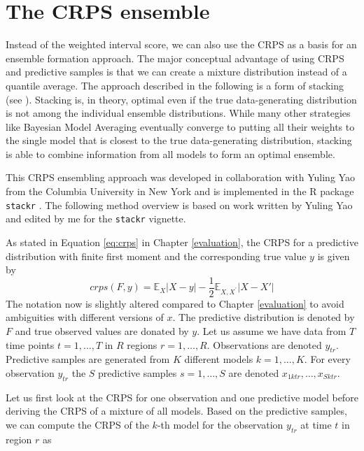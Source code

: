 \documentclass[
]{book}
\begin{document}
\hypertarget{the-crps-ensemble}{%
\section{The CRPS ensemble}\label{the-crps-ensemble}}

Instead of the weighted interval score, we can also use the CRPS as a basis for an ensemble formation approach. The major conceptual advantage of using CRPS and predictive samples is that we can create a mixture distribution instead of a quantile average. The approach described in the following is a form of stacking (see \citet{yaoUsingStackingAverage2018}). Stacking is, in theory, optimal even if the true data-generating distribution is not among the individual ensemble distributions. While many other strategies like Bayesian Model Averaging eventually \citep{rafteryBayesianModelAveraging1997, hoetingBayesianModelAveraging1999, rafteryUsingBayesianModel2005} converge to putting all their weights to the single model that is closest to the true data-generating distribution, stacking is able to combine information from all models to form an optimal ensemble.

This CRPS ensembling approach was developed in collaboration with Yuling Yao from the Columbia University in New York and is implemented in the R package \texttt{stackr} \citep{R-stackr}. The following method overview is based on work written by Yuling Yao and edited by me for the \texttt{stackr} vignette.

As stated in Equation \eqref{eq:crps} in Chapter \ref{evaluation}, the CRPS for a predictive distribution with finite first moment and the corresponding true value \(y\) is given by
\[crps(F,y)=\mathbb{E}_X|X-y|- \frac{1}{2}\mathbb{E}_{X,X^\prime}|X-X'|\]
The notation now is slightly altered compared to Chapter \ref{evaluation} to avoid ambiguities with different versions of \(x\). The predictive distribution is denoted by \(F\) and true observed values are donated by \(y\). Let us assume we have data from \(T\) time points \(t = 1, \dots, T\) in \(R\) regions \(r = 1, \dots, R\). Observations are denoted \(y_{tr}\). Predictive samples are generated from \(K\) different models \(k = 1, \dots, K\). For every observation \(y_{tr}\) the \(S\) predictive samples \(s = 1, \dots, S\) are denoted \(x_{1ktr}, \dots, x_{Sktr}\).

Let us first look at the CRPS for one observation and one predictive model before deriving the CRPS of a mixture of all models. Based on the predictive samples, we can compute the CRPS of the \(k\)-th model for the observation \(y_{tr}\) at time \(t\) in region \(r\) as
\end{document}

